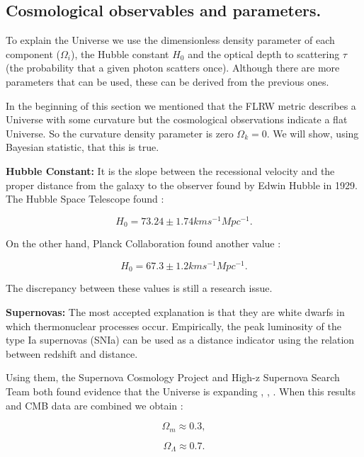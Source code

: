 \documentclass[onecolumn,           %
               showpacs,            %
               preprintnumbers,     %
               aps,                 %
               prl,          	    %
               letterpaper,             %
               superscriptaddress,      %
               nofootinbib,         %
               tightenlines,        %
               floats,floatfix      %
               ,usenatbib,
               ]{revtex4-1}
\begin{document}
\subsection{Cosmological observables and parameters.}
To explain the Universe we use the dimensionless density parameter of each component ($\Omega_i$), the Hubble constant $H_0$ and the optical depth to
scattering $\tau$ (the probability that a given photon scatters once). Although there are more parameters that can be used, these can be derived from the previous ones.

In the beginning of this section we mentioned that the FLRW metric describes a Universe with some curvature but the cosmological observations indicate a flat Universe. So the curvature density parameter is zero $\Omega_k = 0$. We will show, using Bayesian statistic, that this is true.

\textbf{Hubble Constant:} It is the slope between the recessional velocity and the proper distance from the galaxy to the observer found by Edwin Hubble in 1929. The Hubble Space Telescope found \cite{hubble2016}:

\begin{equation}
H_0 = 73.24 \pm 1.74 kms^{-1} Mpc^{-1}.
\end{equation}

On the other hand, Planck Collaboration found another value \cite{planck}:
	
\begin{equation}
H_0 = 67.3 \pm 1.2 kms^{-1} Mpc^{-1}.
\end{equation}
	
The discrepancy between these values ​​is still a research issue.

\textbf{Supernovas:} The most accepted explanation is that they are white dwarfs in which thermonuclear processes occur. Empirically, the peak luminosity of the type Ia supernovas (SNIa) can be used as a distance indicator using the relation between redshift and distance\cite{parametros}. 

Using them, the Supernova Cosmology Project and High-z Supernova Search Team both found evidence that the Universe is expanding \cite{supernova1}, \cite{supernova2}, \cite{supernova3}. When this results and CMB data are combined we obtain \cite{parametros}:

\begin{equation}
\Omega_m \approx 0.3,
\end{equation}

\begin{equation}
\Omega_{\Lambda} \approx 0.7 .
\end{equation}
\end{document}
